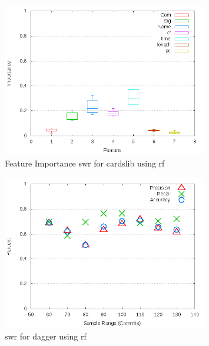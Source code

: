 \begin{figure}[!t]
\centering
\includegraphics[width=0.8\textwidth]{images/rf/test_1/cardslib_importance.png}
\caption{Feature Importance \gls{swr} for cardslib using \gls{rf}}
\label{fig:test_1_cardslib_rf_importance}
\end{figure}

\begin{figure}[!t]
\centering
\includegraphics[width=0.8\textwidth]{images/rf/test_1/dagger_sample_range.png}
\caption{\gls{swr} for dagger using \gls{rf}}
\label{fig:test_1_dagger_rf}
\end{figure}

